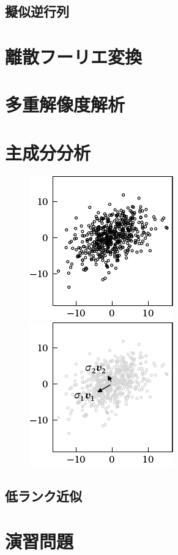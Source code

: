 \documentclass[../../main]{subfiles}
\begin{document}
\subsection{擬似逆行列}

\section{離散フーリエ変換}

\section{多重解像度解析}

\section{主成分分析}
\begin{figure}[htbp]
  \begin{minipage}{\linewidth/2}
    \centering
    \includegraphics{scatter.pdf}
  \end{minipage}%
  \begin{minipage}{\linewidth/2}
    \centering
    \includegraphics{pca.pdf}
  \end{minipage}
\end{figure}

\begin{subappendices}
\section{低ランク近似}
\end{subappendices}

\section*{演習問題}
\end{document}
